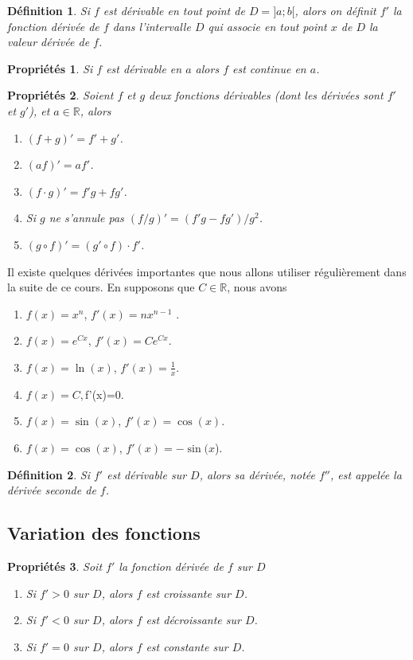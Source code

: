 \documentclass[a4paper,12pt]{book}
\newcommand{\real}{\mathbb{R}}
\newtheorem{definition}{Définition}
\newtheorem{proprietes}{Propriétés}
\begin{document}
\begin{definition} Si $f$ est dérivable en tout point de $D=]a;b[$, alors on définit
$f'$ la fonction dérivée de $f$ dans l'intervalle $D$ qui associe en tout point $x$ de
$D$ la valeur dérivée de $f$.
\end{definition}

\begin{proprietes} 
Si $f$ est dérivable en $a$ alors $f$ est continue en $a$. 
\end{proprietes}

\begin{proprietes} 
Soient $f$ et $g$ deux fonctions dérivables (dont les dérivées sont $f'$ et $g'$), et $a\in\real$, alors
\begin{enumerate}
\item $(f+g)'=f'+g'$.
\item $(af)'=a f'$.
\item $(f\cdot g)'=f'g+fg'$.
\item Si $g$ ne s'annule pas $(f/g)'=(f'g-fg')/g^2$.
\item $(g\circ f)'=(g'\circ f)\cdot f'$.
\end{enumerate}
\end{proprietes}

Il existe quelques dérivées importantes que nous allons utiliser régulièrement dans la suite de ce cours. 
En supposons que $C\in \real$, nous avons
\begin{enumerate}
\item $f(x)=x^n$, $f'(x)=nx^{n-1}$ .
\item $f(x)=e^{C x}$, $f'(x)=Ce^{Cx}$.
\item $f(x)=\ln(x)$, $f'(x)=\frac{1}{x}$.
\item $f(x)=C, $f'(x)=0.
\item $f(x)=\sin(x)$, $f'(x)=\cos(x)$.
\item $f(x)=\cos(x)$, $f'(x)=-\sin(x$).
\end{enumerate}


\begin{definition} 
Si $f'$ est dérivable sur $D$, alors sa dérivée, notée $f''$, est appelée la dérivée seconde de $f$.
\end{definition}

\subsection{Variation des fonctions}

\begin{proprietes} Soit $f'$ la fonction dérivée de $f$ sur $D$
\begin{enumerate}
\item Si $f'>0$ sur $D$, alors $f$ est croissante sur $D$.
\item Si $f'<0$ sur $D$, alors $f$ est décroissante sur $D$.
\item Si $f'=0$ sur $D$, alors $f$ est constante sur $D$.
\end{enumerate}
\end{proprietes}
\end{document}
